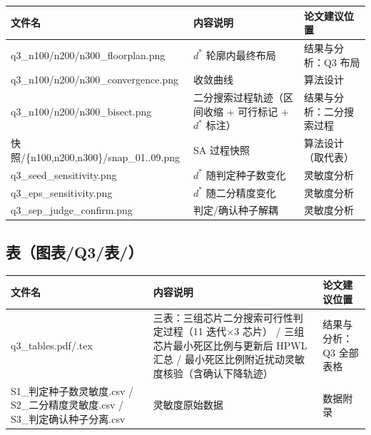 \documentclass[12pt,a4paper]{article}
\begin{document}
\begin{table}[H]
\centering
\scriptsize
\setlength{\tabcolsep}{1.5pt}
\begin{tabular}{>{\raggedright\arraybackslash}p{4.4cm}>{\raggedright\arraybackslash}p{7.6cm}>{\raggedright\arraybackslash}p{3.4cm}}
\toprule
文件名 & 内容说明 & 论文建议位置 \\
\midrule
q3\_\allowbreak{}n100/n200/n300\_\allowbreak{}floorplan.png & $d^*$ 轮廓内最终布局 & 结果与分析：Q3 布局 \\
q3\_\allowbreak{}n100/n200/n300\_\allowbreak{}convergence.png & 收敛曲线 & 算法设计 \\
q3\_\allowbreak{}n100/n200/n300\_\allowbreak{}bisect.png & 二分搜索过程轨迹（区间收缩 + 可行标记 + $d^*$ 标注） & 结果与分析：二分搜索过程 \\
快照/\{n100,n200,n300\}/snap\_\allowbreak{}01..09.png & SA 过程快照 & 算法设计（取代表） \\
q3\_\allowbreak{}seed\_\allowbreak{}sensitivity.png & $d^*$ 随判定种子数变化 & 灵敏度分析 \\
q3\_\allowbreak{}eps\_\allowbreak{}sensitivity.png & $d^*$ 随二分精度变化 & 灵敏度分析 \\
q3\_\allowbreak{}sep\_\allowbreak{}judge\_\allowbreak{}confirm.png & 判定/确认种子解耦 & 灵敏度分析 \\
\bottomrule
\end{tabular}
\end{table}

\subsection{表（图表/Q3/表/）}

\begin{table}[H]
\centering
\scriptsize
\setlength{\tabcolsep}{1.5pt}
\begin{tabular}{>{\raggedright\arraybackslash}p{4.4cm}>{\raggedright\arraybackslash}p{7.6cm}>{\raggedright\arraybackslash}p{3.4cm}}
\toprule
文件名 & 内容说明 & 论文建议位置 \\
\midrule
q3\_\allowbreak{}tables.pdf/.tex & 三表：三组芯片二分搜索可行性判定过程（11 迭代×3 芯片） / 三组芯片最小死区比例与更新后 HPWL 汇总 / 最小死区比例附近扰动灵敏度核验（含确认下降轨迹） & 结果与分析：Q3 全部表格 \\
S1\_\allowbreak{}判定种子数灵敏度.csv / S2\_\allowbreak{}二分精度灵敏度.csv / S3\_\allowbreak{}判定确认种子分离.csv & 灵敏度原始数据 & 数据附录 \\
\bottomrule
\end{tabular}
\end{table}
\end{document}
